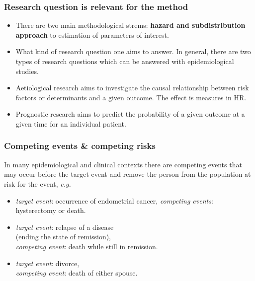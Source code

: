 \documentclass[handout,12pt]{beamer}
\begin{document}
\begin{frame}
\frametitle{Research question is relevant for the method}

\begin{itemize}
\item There are two main methodological strems: \textbf{hazard and subdistribution approach} to estimation of parameters of interest.  
\item What kind of research question one aims to answer. In general,
there are two types of research questions which can be
answered with epidemiological studies. 
\item Aetiological research aims to investigate the causal relationship between risk factors or determinants and a given outcome. The effect is measures in HR.
\item Prognostic research aims to predict the probability of a given outcome at a given time for an individual patient.
\end{itemize}
\end{frame}

\begin{frame}
\frametitle{Competing events \& competing risks}

In many epidemiological and clinical contexts there are
competing events that may 
occur before the target event and remove the person from 
 the population at risk for the event, \textit{e.g.}

\begin{itemize}
\item \textit{target event}: occurrence of endometrial cancer,
 \textit{competing events}: hysterectomy or death.
\medskip
\item \textit{target event}: relapse of a disease \\
(ending the state of remission), \\
 \textit{competing event}: death while still in remission.
 
\item \textit{target event}: divorce, \\ 
 \textit{competing event}: death of either spouse.
 
\end{itemize}

\end{frame}
\end{document}
